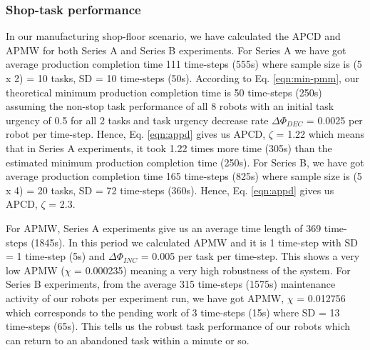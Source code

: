 \documentclass[smallcondensed]{svjour3}
\begin{document}
\subsubsection{Shop-task performance}
In our manufacturing shop-floor scenario, we have calculated the APCD and APMW for both Series A and Series B experiments. For Series A we have got  average production completion time 111 time-steps (555s) where sample size is (5 x 2) = 10 tasks, SD = 10 time-steps (50s). According to Eq. \ref{eqn:min-pmm}, our theoretical minimum production completion time is 50 time-steps (250s) assuming the non-stop task performance of all 8 robots with an initial task urgency of 0.5 for all 2 tasks and task urgency decrease rate $\Delta \Phi_{DEC }$ = 0.0025 per robot per time-step.  Hence, Eq. \ref{eqn:appd} gives us APCD, $\zeta$ = 1.22 which means that in Series A experiments, it took 1.22 times more time (305s) than the estimated minimum production completion time (250s). For Series B, we have got average production completion time 165 time-steps (825s) where sample size is (5 x 4) = 20 tasks, SD = 72 time-steps (360s).  Hence, Eq. \ref{eqn:appd} gives us APCD, $\zeta$ = 2.3.

For APMW, Series A experiments give us an average time length of 369 time-steps (1845s).  In this period we calculated APMW and it is 1 time-step with SD = 1 time-step (5s) and $\Delta \Phi_{INC}$ = 0.005 per task per time-step. This shows a very low APMW ($\chi$ = 0.000235) meaning a very high robustness of the system. For Series B experiments, from the average 315 time-steps (1575s) maintenance activity of our robots per experiment run, we have got APMW, $\chi$ = 0.012756 which corresponds to the pending work of 3 time-steps (15s) where SD = 13 time-steps (65s). This tells us the robust task performance of our robots which can return to an abandoned task within a minute or so.
\end{document}
